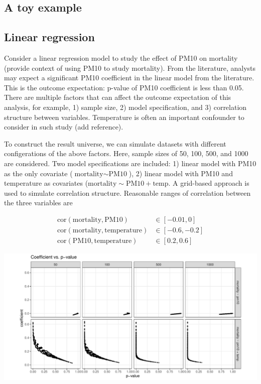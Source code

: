 \documentclass[
]{jds}
\begin{document}
\subsection{A toy example}\label{a-toy-example}

\subsection{Linear regression}\label{linear-regression}

Consider a linear regression model to study the effect of PM10 on
mortality (provide context of using PM10 to study mortality). From the
literature, analysts may expect a significant PM10 coefficient in the
linear model from the literature. This is the outcome expectation:
p-value of PM10 coefficient is less than 0.05. There are multiple
factors that can affect the outcome expectation of this analysis, for
example, 1) sample size, 2) model specification, and 3) correlation
structure between variables. Temperature is often an important
confounder to consider in such study (add reference).

To construct the result universe, we can simulate datasets with
different configerations of the above factors. Here, sample sizes of 50,
100, 500, and 1000 are considered. Two model specifications are
included: 1) linear model with PM10 as the only covariate
(\(\text{mortality} \sim \text{PM10}\)), 2) linear model with PM10 and
temperature as covariates
(\(\text{mortality} \sim \text{PM10} + \text{temp}\). A grid-based
approach is used to simulate correlation structure. Reasonable ranges of
correlation between the three variables are

\begin{align*}
\text{cor}(\text{mortality}, \text{PM10}) &\in [-0.01, 0] \\ 
\text{cor}(\text{mortality}, \text{temperature}) &\in [-0.6, -0.2] \\ \text{cor}(\text{PM10}, \text{temperature}) &\in [0.2, 0.6] 
\end{align*}

\includegraphics{index_files/figure-pdf/unnamed-chunk-2-1.pdf}
\end{document}
